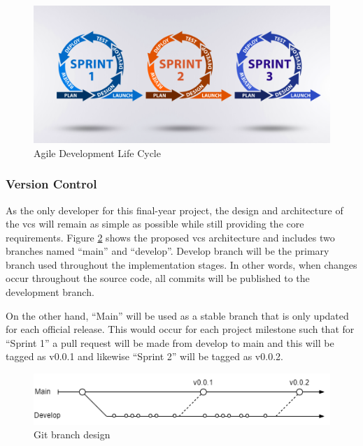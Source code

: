 \documentclass[11pt]{article}
\begin{document}
\begin{figure}[H]
  \centering
  \includegraphics[width=\textwidth]{images/development_life_cycle.png}
  \caption{Agile Development Life Cycle \cite{agile}}
  \label{fig:development_life_cycle}
\end{figure}

\subsubsection{Version Control}
As the only developer for this final-year project, the design and architecture
of the \gls*{vcs} will remain as simple as possible while still providing the
core requirements. Figure \ref{fig:brancharch} shows the proposed \gls*{vcs}
architecture and includes two branches named ``main'' and ``develop''. Develop
branch will be the primary branch used throughout the implementation stages. In
other words, when changes occur throughout the source code, all commits will be
published to the development branch.

On the other hand, ``Main'' will be used as a stable branch that is only updated
for each official release. This would occur for each project milestone such that
for ``Sprint 1'' a pull request will be made from develop to main and this will
be tagged as v0.0.1 and likewise ``Sprint 2'' will be tagged as v0.0.2.

\begin{figure}[H]
  \centering
  \includegraphics[width=\textwidth]{images/current_branch_design.png}
  \caption{Git branch design}
  \label{fig:brancharch}
\end{figure}
\end{document}
